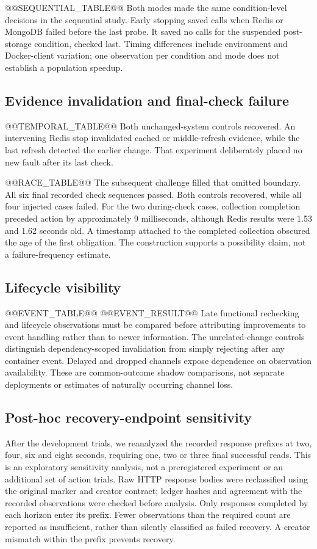 \documentclass[manuscript,review,nonacm]{acmart}
\begin{document}
@@SEQUENTIAL_TABLE@@
Both modes made the same condition-level decisions in the sequential study. Early stopping saved calls when Redis or MongoDB failed before the last probe. It saved no calls for the suspended post-storage condition, checked last. Timing differences include environment and Docker-client variation; one observation per condition and mode does not establish a population speedup.

\subsection{Evidence invalidation and final-check failure}
@@TEMPORAL_TABLE@@
Both unchanged-system controls recovered. An intervening Redis stop invalidated cached or middle-refresh evidence, while the last refresh detected the earlier change. That experiment deliberately placed no new fault after its last check.

@@RACE_TABLE@@
The subsequent challenge filled that omitted boundary. All six final recorded check sequences passed. Both controls recovered, while all four injected cases failed. For the two during-check cases, collection completion preceded action by approximately 9 milliseconds, although Redis results were 1.53 and 1.62 seconds old. A timestamp attached to the completed collection obscured the age of the first obligation. The construction supports a possibility claim, not a failure-frequency estimate.

\subsection{Lifecycle visibility}
@@EVENT_TABLE@@
@@EVENT_RESULT@@
Late functional rechecking and lifecycle observations must be compared before attributing improvements to event handling rather than to newer information. The unrelated-change controls distinguish dependency-scoped invalidation from simply rejecting after any container event. Delayed and dropped channels expose dependence on observation availability. These are common-outcome shadow comparisons, not separate deployments or estimates of naturally occurring channel loss.

\subsection{Post-hoc recovery-endpoint sensitivity}
After the development trials, we reanalyzed the recorded response prefixes at two, four, six and eight seconds, requiring one, two or three final successful reads. This is an exploratory sensitivity analysis, not a preregistered experiment or an additional set of action trials. Raw HTTP response bodies were reclassified using the original marker and creator contract; ledger hashes and agreement with the recorded observations were checked before analysis. Only responses completed by each horizon enter its prefix. Fewer observations than the required count are reported as insufficient, rather than silently classified as failed recovery. A creator mismatch within the prefix prevents recovery.
\end{document}
